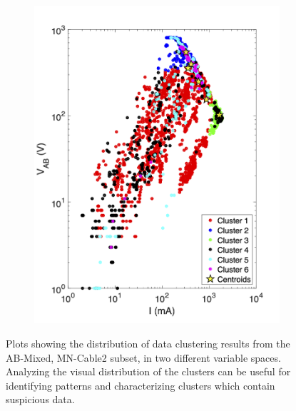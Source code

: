 \documentclass[final,authoryear,5p,times,twocolumn]{elsarticle}
\begin{document}
\begin{figure}[!ht]
\begin{subfigure}[b]{0.475\linewidth}
       \includegraphics[trim=0.3cm 0.7cm 1.5cm 1.8cm, clip=true, width=\linewidth]{./Figures/Fig12b.png}
       \caption{}
       \label{fig:AB_Mixed_MN_Cable2_Vab_vs_I_Cluster}
   \end{subfigure}

   \caption{Plots showing the distribution of data clustering results from the AB-Mixed, MN-Cable2 subset, in two different variable spaces. Analyzing the visual distribution of the clusters can be useful for identifying patterns and characterizing clusters which contain suspicious data.}
   \label{fig:AB_Mixed_MN_Cable2_ClusterComp}
\end{figure}
\end{document}
